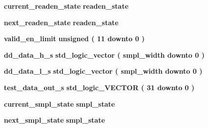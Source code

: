 \begin{DoxyCompactItemize}
\item 
{\bf current\+\_\+readen\+\_\+state} {\bfseries {\bfseries {\bf readen\+\_\+state}} \textcolor{vhdlchar}{ }} 
\item 
{\bf next\+\_\+readen\+\_\+state} {\bfseries {\bfseries {\bf readen\+\_\+state}} \textcolor{vhdlchar}{ }} 
\item 
{\bf valid\+\_\+en\+\_\+limit} {\bfseries \textcolor{comment}{unsigned}\textcolor{vhdlchar}{ }\textcolor{vhdlchar}{(}\textcolor{vhdlchar}{ }\textcolor{vhdlchar}{ } \textcolor{vhdldigit}{11} \textcolor{vhdlchar}{ }\textcolor{keywordflow}{downto}\textcolor{vhdlchar}{ }\textcolor{vhdlchar}{ } \textcolor{vhdldigit}{0} \textcolor{vhdlchar}{ }\textcolor{vhdlchar}{)}\textcolor{vhdlchar}{ }} 
\item 
{\bf dd\+\_\+data\+\_\+h\+\_\+s} {\bfseries \textcolor{comment}{std\+\_\+logic\+\_\+vector}\textcolor{vhdlchar}{ }\textcolor{vhdlchar}{(}\textcolor{vhdlchar}{ }\textcolor{vhdlchar}{ }\textcolor{vhdlchar}{ }\textcolor{vhdlchar}{ }{\bfseries {\bf smpl\+\_\+width}} \textcolor{vhdlchar}{ }\textcolor{keywordflow}{downto}\textcolor{vhdlchar}{ }\textcolor{vhdlchar}{ } \textcolor{vhdldigit}{0} \textcolor{vhdlchar}{ }\textcolor{vhdlchar}{)}\textcolor{vhdlchar}{ }} 
\item 
{\bf dd\+\_\+data\+\_\+l\+\_\+s} {\bfseries \textcolor{comment}{std\+\_\+logic\+\_\+vector}\textcolor{vhdlchar}{ }\textcolor{vhdlchar}{(}\textcolor{vhdlchar}{ }\textcolor{vhdlchar}{ }\textcolor{vhdlchar}{ }\textcolor{vhdlchar}{ }{\bfseries {\bf smpl\+\_\+width}} \textcolor{vhdlchar}{ }\textcolor{keywordflow}{downto}\textcolor{vhdlchar}{ }\textcolor{vhdlchar}{ } \textcolor{vhdldigit}{0} \textcolor{vhdlchar}{ }\textcolor{vhdlchar}{)}\textcolor{vhdlchar}{ }} 
\item 
{\bf test\+\_\+data\+\_\+out\+\_\+s} {\bfseries \textcolor{comment}{std\+\_\+logic\+\_\+\+V\+E\+C\+T\+OR}\textcolor{vhdlchar}{ }\textcolor{vhdlchar}{(}\textcolor{vhdlchar}{ }\textcolor{vhdlchar}{ } \textcolor{vhdldigit}{31} \textcolor{vhdlchar}{ }\textcolor{keywordflow}{downto}\textcolor{vhdlchar}{ }\textcolor{vhdlchar}{ } \textcolor{vhdldigit}{0} \textcolor{vhdlchar}{ }\textcolor{vhdlchar}{)}\textcolor{vhdlchar}{ }} 
\item 
{\bf current\+\_\+smpl\+\_\+state} {\bfseries {\bfseries {\bf smpl\+\_\+state}} \textcolor{vhdlchar}{ }} 
\item 
{\bf next\+\_\+smpl\+\_\+state} {\bfseries {\bfseries {\bf smpl\+\_\+state}} \textcolor{vhdlchar}{ }} 
\end{DoxyCompactItemize}
